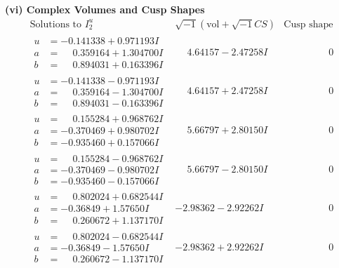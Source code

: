 \documentclass[1p]{elsarticle_modified}
\theoremstyle{definition}
\newcommand{\I}{\sqrt{-1}}
\begin{document}
\newpage\flushleft \textbf{(vi) Complex Volumes and Cusp Shapes}
$$\begin{array}{c|c|c}  
\text{Solutions to }I^u_{2}& \I (\text{vol} + \sqrt{-1}CS) & \text{Cusp shape}\\
 \hline 
\begin{aligned}
u &= -0.141338 + 0.971193 I \\
a &= \phantom{-}0.359164 + 1.304700 I \\
b &= \phantom{-}0.894031 + 0.163396 I\end{aligned}
 & \phantom{-}4.64157 - 2.47258 I & \phantom{-0.000000 } 0 \\ \hline\begin{aligned}
u &= -0.141338 - 0.971193 I \\
a &= \phantom{-}0.359164 - 1.304700 I \\
b &= \phantom{-}0.894031 - 0.163396 I\end{aligned}
 & \phantom{-}4.64157 + 2.47258 I & \phantom{-0.000000 } 0 \\ \hline\begin{aligned}
u &= \phantom{-}0.155284 + 0.968762 I \\
a &= -0.370469 + 0.980702 I \\
b &= -0.935460 + 0.157066 I\end{aligned}
 & \phantom{-}5.66797 + 2.80150 I & \phantom{-0.000000 } 0 \\ \hline\begin{aligned}
u &= \phantom{-}0.155284 - 0.968762 I \\
a &= -0.370469 - 0.980702 I \\
b &= -0.935460 - 0.157066 I\end{aligned}
 & \phantom{-}5.66797 - 2.80150 I & \phantom{-0.000000 } 0 \\ \hline\begin{aligned}
u &= \phantom{-}0.802024 + 0.682544 I \\
a &= -0.36849 + 1.57650 I \\
b &= \phantom{-}0.260672 + 1.137170 I\end{aligned}
 & -2.98362 - 2.92262 I & \phantom{-0.000000 } 0 \\ \hline\begin{aligned}
u &= \phantom{-}0.802024 - 0.682544 I \\
a &= -0.36849 - 1.57650 I \\
b &= \phantom{-}0.260672 - 1.137170 I\end{aligned}
 & -2.98362 + 2.92262 I & \phantom{-0.000000 } 0 \\ \hline\begin{aligned}

\end{aligned}
\end{array}$$
\end{document}
